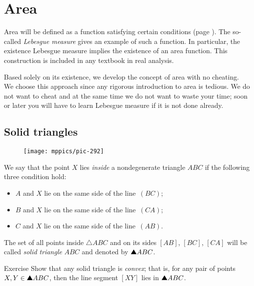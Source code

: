 \chapter{Area}
\label{chap:area}

Area will be defined as a function satisfying certain conditions (page \pageref{page:area-def}).
The so-called {}\emph{Lebesgue measure} gives an example of such a function.
In particular, the existence Lebesgue measure implies the existence of an area function.
This construction is included in any textbook in real analysis.

Based solely on its existence,  we develop the concept of area with no cheating.
We choose this approach since any rigorous introduction to area is tedious.
We do not want to cheat and at the same time we do not want to waste your time; 
soon or later you will have to learn Lebesgue measure if it is not done already.

\section*{Solid triangles}

{

\begin{wrapfigure}{r}{27 mm}
\vskip-8mm
\centering
\texttt{[image: mppics/pic-292]}
\end{wrapfigure}

We say that the point $X$ lies \emph{inside} a nondegenerate triangle $ABC$
if the following three condition hold:


\begin{itemize}
\item $A$ and $X$ lie on the same side of the line~$(BC)$;
\item $B$ and $X$ lie on the same side of the line~$(CA)$;
\item $C$ and $X$ lie on the same side of the line~$(AB)$.
\end{itemize}

}

The set of all points inside $\triangle ABC$ 
and on its sides $[AB]$, $[BC]$, $[CA]$
will be called \emph{solid triangle} $ABC$ and denoted by $\solidtriangle ABC$.

\begin{thm}{Exercise}\label{ex:triangle-convex}
Show that any solid triangle is \emph{convex};
that is, for any pair of points $X,Y\z\in\solidtriangle ABC$,
then the line segment $[XY]$ lies in  $\solidtriangle ABC$.
\end{thm}



